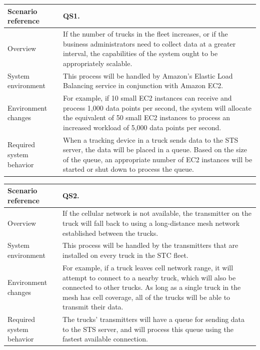 \documentclass[a4paper,11pt]{report}
\begin{document}
\begin{center}
  \begin{tabular}[h!]{| >{\columncolor{gray}}p{} | p{} |}
    \hline
    Scenario reference & QS1. \\
    \hline
    Overview & If the number of trucks in the fleet increases, or if the business
    administrators need to collect data at a greater interval, the capabilities
    of the system ought to be appropriately scalable.\\
    \hline
    System environment & This process will be handled
    by Amazon's Elastic Load Balancing service in conjunction with Amazon EC2.\\
    \hline
    Environment changes & For example, if 10 small EC2
    instances can receive and process 1,000 data points per second, the system will
    allocate the equivalent of 50 small EC2 instances to process an increased
    workload of 5,000 data points per second.\\
    \hline
    Required system behavior & When a tracking device in
    a truck sends data to the STS server, the data will be placed in a queue.
    Based on the size of the queue, an appropriate number of EC2 instances will
    be started or shut down to process the queue.\\
    \hline
  \end{tabular}
\end{center}
\begin{center}
  \begin{tabular}[h!]{| >{\columncolor{gray}}p{} | p{} |}
    \hline
    Scenario reference & QS2. \\
    \hline
    Overview & If the cellular network is not available, the transmitter on the
    truck will fall back to using a long-distance mesh network established
    between the trucks. \\
    \hline
    System environment & This process will be handled
    by the transmitters that are installed on every truck in the STC fleet.\\
    \hline
    Environment changes & For example, if a truck leaves cell network range, it
    will attempt to connect to a nearby truck, which will also be connected to
    other trucks. As long as a single truck in the mesh has cell coverage, all
    of the trucks will be able to transmit their data.\\
    \hline
    Required system behavior & The trucks' transmitters will have a queue for
    sending data to the STS server, and will process this queue using the
    fastest available connection.\\
    \hline
  \end{tabular}
\end{center}
\end{document}

